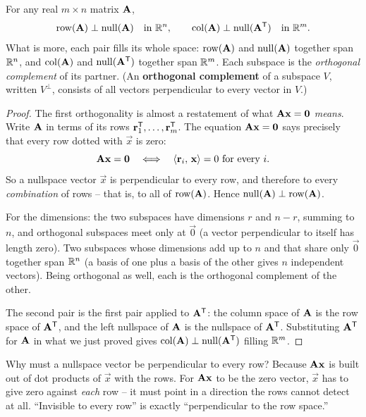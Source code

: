 \begin{theorem}\label{ch16:orthog}
For any real $m\times n$ matrix $\mathbf{A}$,
\[
  \operatorname{row}(\mathbf{A}) \perp \operatorname{null}(\mathbf{A}) \quad\text{in } \mathbb{R}^n,
  \qquad
  \operatorname{col}(\mathbf{A}) \perp \operatorname{null}(\mathbf{A}^{\mathsf{T}}) \quad\text{in } \mathbb{R}^m.
\]
What is more, each pair fills its whole space: $\operatorname{row}(\mathbf{A})$ and $\operatorname{null}(\mathbf{A})$
together span $\mathbb{R}^n$, and $\operatorname{col}(\mathbf{A})$ and $\operatorname{null}(\mathbf{A}^{\mathsf{T}})$ together span
$\mathbb{R}^m$. Each subspace is the \emph{orthogonal complement} of its partner. (An
\textbf{orthogonal complement} of a subspace $V$, written $V^\perp$, consists of
all vectors perpendicular to every vector in $V$.)
\end{theorem}

\begin{proof}
The first orthogonality is almost a restatement of what $\mathbf{A}\mathbf{x}=\mathbf{0}$
\emph{means}. Write $\mathbf{A}$ in terms of its rows
$\mathbf{r}_1^{\mathsf{T}},\dots,\mathbf{r}_m^{\mathsf{T}}$. The equation $\mathbf{A}\mathbf{x}=\mathbf{0}$ says
precisely that every row dotted with $\vec{x}$ is zero:
\[
  \mathbf{A}\mathbf{x} = \mathbf{0}
  \quad\Longleftrightarrow\quad
  \langle \mathbf{r}_i,\, \mathbf{x} \rangle = 0 \text{ for every } i.
\]
So a nullspace vector $\vec{x}$ is perpendicular to every row, and therefore to
every \emph{combination} of rows -- that is, to all of $\operatorname{row}(\mathbf{A})$. Hence
$\operatorname{null}(\mathbf{A}) \perp \operatorname{row}(\mathbf{A})$.

For the dimensions: the two subspaces have dimensions $r$ and $n-r$, summing to
$n$, and orthogonal subspaces meet only at $\vec0$ (a vector perpendicular to
itself has length zero). Two subspaces whose dimensions add up to $n$ and that
share only $\vec0$ together span $\mathbb{R}^n$ (a basis of one plus a basis of the
other gives $n$ independent vectors). Being orthogonal as well, each is the
orthogonal complement of the other.

The second pair is the first pair applied to $\mathbf{A}^{\mathsf{T}}$: the column space of
$\mathbf{A}$ is the row space of $\mathbf{A}^{\mathsf{T}}$, and the left nullspace of $\mathbf{A}$ is
the nullspace of $\mathbf{A}^{\mathsf{T}}$. Substituting $\mathbf{A}^{\mathsf{T}}$ for $\mathbf{A}$ in what we
just proved gives $\operatorname{col}(\mathbf{A}) \perp \operatorname{null}(\mathbf{A}^{\mathsf{T}})$ filling $\mathbb{R}^m$.
\end{proof}

\begin{intuitionbox}
Why must a nullspace vector be perpendicular to every row? Because
$\mathbf{A}\mathbf{x}$ is built out of dot products of $\vec{x}$ with the rows. For
$\mathbf{A}\mathbf{x}$ to be the zero vector, $\vec{x}$ has to give zero against
\emph{each} row -- it must point in a direction the rows cannot detect at all.
``Invisible to every row'' is exactly ``perpendicular to the row space.''
\end{intuitionbox}

